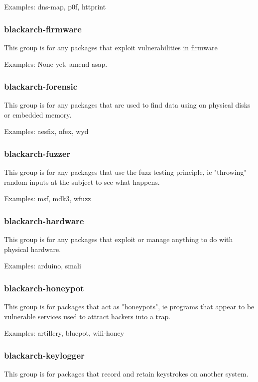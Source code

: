 \documentclass[a4paper, oneside, 11pt]{book}
\begin{document}
Examples: dns-map, p0f, httprint

\subsubsection{blackarch-firmware}

This group is for any packages that exploit vulnerabilities in firmware

Examples: None yet, amend asap.

\subsubsection{blackarch-forensic}

This group is for any packages that are used to find data using on physical disks or embedded memory.

Examples: aesfix, nfex, wyd

\subsubsection{blackarch-fuzzer}

This group is for any packages that use the fuzz testing principle, ie "throwing" random inputs at the subject to see what happens.

Examples: msf, mdk3, wfuzz

\subsubsection{blackarch-hardware}

This group is for any packages that exploit or manage anything to do with physical hardware.

Examples: arduino, smali

\subsubsection{blackarch-honeypot}

This group is for packages that act as "honeypots", ie programs that appear to be vulnerable services used to attract hackers into a trap.

Examples: artillery, bluepot, wifi-honey

\subsubsection{blackarch-keylogger}

This group is for packages that record and retain keystrokes on another system.
\end{document}
